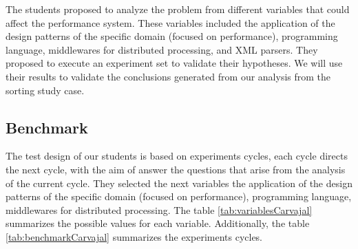 The students proposed to analyze the problem from different variables that could affect the performance system. These variables included the application of the design patterns of the specific domain (focused on performance), programming language, middlewares for distributed processing, and XML parsers. They proposed to execute an experiment set to validate their hypotheses. We will use their results to validate the conclusions generated from our analysis from the sorting study case.

\subsection{Benchmark}

The test design of our students is based on experiments cycles, each cycle directs the next cycle, with the aim of answer the questions that arise from the analysis of the current cycle. They selected the next variables the application of the design patterns of the specific domain (focused on performance), programming language, middlewares for distributed processing. The table \ref{tab:variablesCarvajal} summarizes the possible values for each variable. Additionally, the table \ref{tab:benchmarkCarvajal} summarizes the experiments cycles.

\begin{table}[H]
	\centering
	\caption{Variables Carvajal XML Files Processing Study Case}
	\label{tab:variablesCarvajal}
\end{table}

